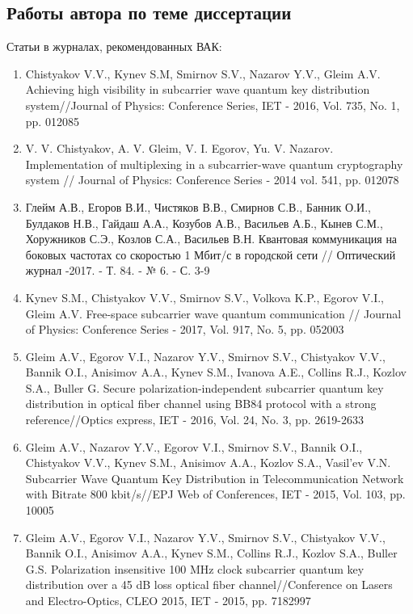{\begin{refsection}
	\section*{Работы автора по теме диссертации}
{Статьи в журналах, рекомендованных ВАК: }
\begin{enumerate}\addtolength{\itemsep}{-0.5\baselineskip}
\renewcommand{\labelenumi}{[\theenumi]}
\item  Chistyakov V.V., Kynev S.M, Smirnov S.V., Nazarov Y.V., Gleim A.V. Achieving high visibility in subcarrier wave quantum key distribution system//Journal of Physics: Conference Series, IET - 2016, Vol. 735, No. 1, pp. 012085
\\
\item V. V. Chistyakov, A. V. Gleim, V. I. Egorov, Yu. V. Nazarov. Implementation of multiplexing in a subcarrier-wave quantum cryptography system // Journal of Physics: Conference Series - 2014  vol. 541,  pp. 012078
\\
\item  Глейм А.В., Егоров В.И., Чистяков В.В., Смирнов С.В., Банник О.И., Булдаков Н.В., Гайдаш А.А., Козубов А.В., Васильев А.Б., Кынев С.М., Хоружников С.Э., Козлов С.А., Васильев В.Н. Квантовая коммуникация на боковых частотах со скоростью 1 Мбит/с в городской сети // Оптический журнал -2017. - Т. 84. - № 6. - С. 3-9
\\
\item   Kynev S.M., Chistyakov V.V., Smirnov S.V., Volkova K.P., Egorov V.I., Gleim A.V. Free-space subcarrier wave quantum communication // Journal of Physics: Conference Series - 2017, Vol. 917, No. 5, pp. 052003
\\
\item    Gleim A.V., Egorov V.I., Nazarov Y.V., Smirnov S.V., Chistyakov V.V., Bannik O.I., Anisimov A.A., Kynev S.M., Ivanova A.E., Collins R.J., Kozlov S.A., Buller G. Secure polarization-independent subcarrier quantum key distribution in optical fiber channel using BB84 protocol with a strong reference//Optics express, IET - 2016, Vol. 24, No. 3, pp. 2619-2633
\\
\item    Gleim A.V., Nazarov Y.V., Egorov V.I., Smirnov S.V., Bannik O.I., Chistyakov V.V., Kynev S.M., Anisimov A.A., Kozlov S.A., Vasil'ev V.N. Subcarrier Wave Quantum Key Distribution in Telecommunication Network with Bitrate 800 kbit/s//EPJ Web of Conferences, IET - 2015, Vol. 103, pp. 10005
\\
\item    Gleim A.V., Egorov V.I., Nazarov Y.V., Smirnov S.V., Chistyakov V.V., Bannik O.I., Anisimov A.A., Kynev S.M., Collins R.J., Kozlov S.A., Buller G.S. Polarization insensitive 100 MHz clock subcarrier quantum key distribution over a 45 dB loss optical fiber channel//Conference on Lasers and Electro-Optics, CLEO 2015, IET - 2015, pp. 7182997

\end{enumerate}
\end{refsection}}
